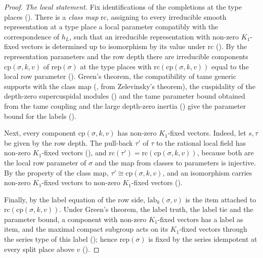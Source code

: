 \begin{proof}
\emph{The local statement.} Fix identifications of the completions at the type places
(). There is a \emph{class map} $\mathrm{rc}$, assigning to every
irreducible smooth representation at a type place a local parameter compatibly with the correspondence of $h_L$, such that an
irreducible representation with non-zero $K_1$-fixed vectors is determined up to isomorphism by its value under $\mathrm{rc}$
(). By the representation parameters and the row depth there are
irreducible components $\mathrm{cp}(\sigma,k,v)$ of $\mathrm{rep}(\sigma)$ at the type places with $\mathrm{rc}(\mathrm{cp}(\sigma,k,v))$
equal to the local row parameter (). Green's theorem, the compatibility of
tame generic supports with the class map (, from Zelevinsky's theorem),
the cuspidality of the depth-zero supercuspidal modules () and
the tame parameter bound obtained from the tame coupling and the large depth-zero inertia
() give the parameter bound for the labels
().

Next, every component $\mathrm{cp}(\sigma,k,v)$ has non-zero $K_1$-fixed vectors. Indeed, let $s,\tau$ be given by the row depth.
The pull-back $\tau'$ of $\tau$ to the rational local field has non-zero $K_1$-fixed vectors
(), and
$\mathrm{rc}(\tau')=\mathrm{rc}(\mathrm{cp}(\sigma,k,v))$, because both are the local row parameter of $\sigma$ and the map from
classes to parameters is injective. By the property of the class map, $\tau'\cong\mathrm{cp}(\sigma,k,v)$, and an isomorphism carries
non-zero $K_1$-fixed vectors to non-zero $K_1$-fixed vectors
().

Finally, by the label equation of the row side, $\mathrm{lab}_k(\sigma,v)$ is the item attached to
$\mathrm{rc}(\mathrm{cp}(\sigma,k,v))$. Under Green's theorem, the label truth, the label tie and the parameter bound, a component with
non-zero $K_1$-fixed vectors has a label as item, and the maximal compact subgroup acts on its $K_1$-fixed vectors through the
series type of this label (); hence $\mathrm{rep}(\sigma)$ is fixed
by the series idempotent at every split place above $v$ ().
\end{proof}

